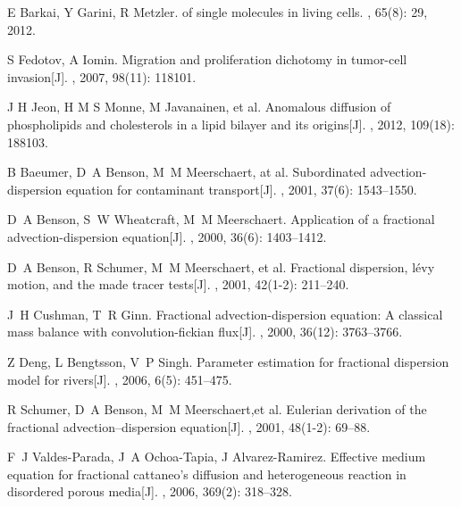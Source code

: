 \documentclass[twoside,UTF8]{nputhesis}
\begin{document}
\begin{thebibliography}{99}
	E Barkai, Y Garini, R Metzler.
	\newblock of single molecules in living cells.
	, 65(8): 29, 2012.
	
	S Fedotov, A Iomin.
	\newblock Migration and proliferation dichotomy in tumor-cell invasion[J].
	, 2007, 98(11): 118101.
	
	J H Jeon, H M S Monne, M Javanainen, et al.
	\newblock Anomalous diffusion of phospholipids and cholesterols in a lipid bilayer and its origins[J].
	, 2012, 109(18): 188103.
	
	B Baeumer, D~A Benson, M~M Meerschaert, at al.
	\newblock Subordinated advection-dispersion equation for contaminant transport[J].
	, 2001, 37(6): 1543--1550.
	
	D~A Benson, S~W Wheatcraft, M~M Meerschaert.
	\newblock Application of a fractional advection-dispersion equation[J].
	, 2000, 36(6): 1403--1412.
	
	D~A Benson, R Schumer, M~M Meerschaert, et al.
	\newblock Fractional dispersion, l{\'e}vy motion, and the made tracer tests[J].
	, 2001, 42(1-2): 211--240.
	
	J~H Cushman, T~R Ginn.
	\newblock Fractional advection-dispersion equation: A classical mass balance
	with convolution-fickian flux[J].
	, 2000, 36(12): 3763--3766.
	
	Z Deng, L Bengtsson, V~P Singh.
	\newblock Parameter estimation for fractional dispersion model for rivers[J].
	, 2006, 6(5): 451--475.
	
	R Schumer, D~A Benson, M~M Meerschaert,et al.
	\newblock Eulerian derivation of the fractional advection--dispersion equation[J].
	, 2001, 48(1-2): 69--88.
	
	
	F~J Valdes-Parada, J~A Ochoa-Tapia, J Alvarez-Ramirez.
	\newblock Effective medium equation for fractional cattaneo's diffusion and
	heterogeneous reaction in disordered porous media[J].
	, 2006, 369(2): 318--328.
	

\end{thebibliography}
\end{document}
